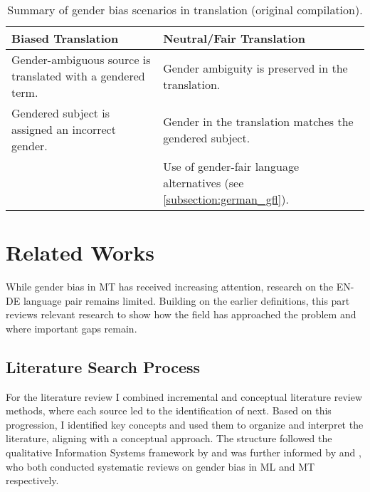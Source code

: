     \begin{table}[htb]
    \centering
    \begin{tabularx}{\linewidth}{X | X}
        \toprule
        \textbf{Biased Translation} & \textbf{Neutral/Fair Translation} \\
        \midrule
        Gender-ambiguous source is translated with a gendered term. & 
        Gender ambiguity is preserved in the translation. \\
        \addlinespace[0.5em]
        Gendered subject is assigned an incorrect gender. & 
        Gender in the translation matches the gendered subject. \\
        \addlinespace[0.5em]
        \multicolumn{1}{c|}{—} & 
        Use of gender-fair language alternatives (see \autoref{subsection:german_gfl}). \\
        \bottomrule
    \end{tabularx}
    \caption[Summary of gender bias scenarios in translation]{Summary of gender bias scenarios in translation (original compilation).}
    \label{tab:overview_bias_neutral}
    \end{table}


\section{Related Works}
While gender bias in MT has received increasing attention, research on the EN-DE language pair remains limited. Building on the earlier definitions, this part reviews relevant research to show how the field has approached the problem and where important gaps remain.

    \subsection{Literature Search Process}
        For the literature review I combined incremental and conceptual literature review methods, where each source led to the identification of next. Based on this progression, I identified key concepts and used them to organize and interpret the literature, aligning with a conceptual approach. The structure followed the qualitative Information Systems framework by \textcite{schryenWritingQualitativeLiterature2015} and was further informed by \textcite{shresthaExploringGenderBiases2022} and \textcite{savoldiDecadeGenderBias2025}, who both conducted systematic reviews on gender bias in ML and MT respectively. 


